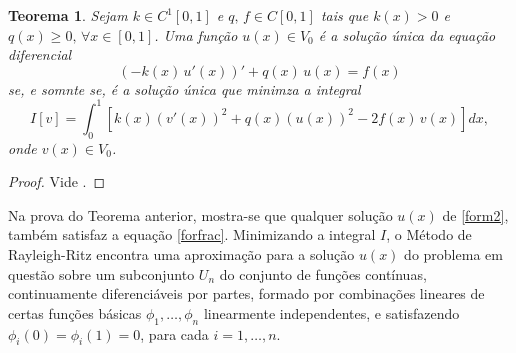 \documentclass[12pt,a4paper]{report}
\newcommand{\dis}{\displaystyle}
\newtheorem{theorem}{Teorema}
\begin{document}
\begin{theorem}\label{teo1}
Sejam $k\in C^1[0,1]$ e $q,\,f\in C[0,1]$ tais que $k(x)>0$ e $q(x)\geq 0,\,\forall x\in[0,1]$. Uma função $u(x)\in V_0$ é a solução única da equação diferencial
\begin{equation}\label{form1}
\left(-k(x)\,u'(x)\right)' + q(x)\,u(x) = f(x)
\end{equation}
se, e somnte se, é a solução única que minimza a integral
\begin{equation}\label{form2}
I[v] = \dis\int_0^1\left[k(x)(v'(x))^2 + q(x)(u(x))^2 - 2f(x)\,v(x)\right]dx,
\end{equation}
onde $v(x)\in V_0$.
\end{theorem}
\begin{proof}
Vide \cite{schu}.
\end{proof}
Na prova do Teorema anterior, mostra-se que qualquer solução $u(x)$ de \eqref{form2}, também satisfaz a equação \eqref{forfrac}. Minimizando a integral $I$, o Método de Rayleigh-Ritz encontra uma aproximação para a solução $u(x)$ do problema em questão sobre um subconjunto $U_n$ do conjunto de funções contínuas, continuamente diferenciáveis por partes, formado por combinações lineares de certas funções básicas $\phi_1,\dots,\phi_n$ linearmente independentes, e satisfazendo $\phi_i(0)=\phi_i(1)=0$, para cada $i=1,\dots,n$. 
\end{document}
